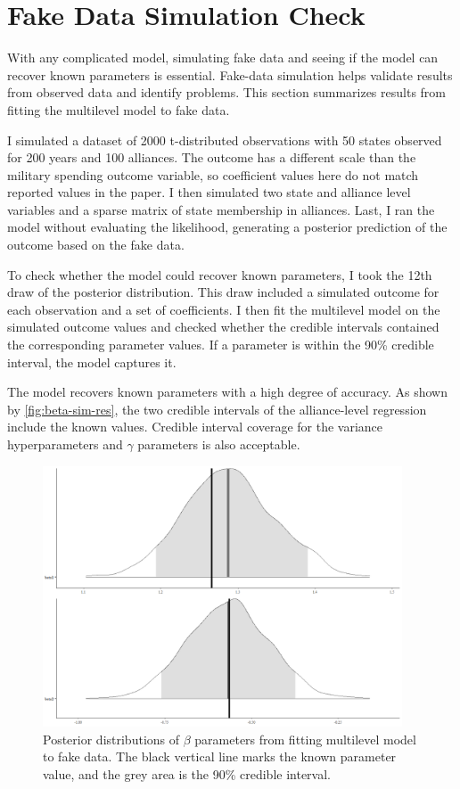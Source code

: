 \documentclass[12pt]{article}
\begin{document}
\section{Fake Data Simulation Check}


With any complicated model, simulating fake data and seeing if the model can recover known parameters is essential. 
Fake-data simulation helps validate results from observed data and identify problems. 
This section summarizes results from fitting the multilevel model to fake data.


I simulated a dataset of 2000 t-distributed observations with 50 states observed for 200 years and 100 alliances. 
The outcome has a different scale than the military spending outcome variable, so coefficient values here do not match reported values in the paper.  
I then simulated two state and alliance level variables and a sparse matrix of state membership in alliances. 
Last, I ran the model without evaluating the likelihood, generating a posterior prediction of the outcome based on the fake data.


To check whether the model could recover known parameters, I took the 12th draw of the posterior distribution.
This draw included a simulated outcome for each observation and a set of coefficients. 
I then fit the multilevel model on the simulated outcome values and checked whether the credible intervals contained the corresponding parameter values. 
If a parameter is within the 90\% credible interval, the model captures it. 


The model recovers known parameters with a high degree of accuracy. 
As shown by \autoref{fig:beta-sim-res}, the two credible intervals of the alliance-level regression include the known values.
Credible interval coverage for the variance hyperparameters and $\gamma$ parameters is also acceptable. 


\begin{figure}[htbp]
	\centering
		\includegraphics[width=0.95\textwidth]{beta-sim-res.png}
	\caption{Posterior distributions of $\beta$ parameters from fitting multilevel model to fake data. The black vertical line marks the known parameter value, and the grey area is the 90\% credible interval.}
	\label{fig:beta-sim-res}
\end{figure}
\end{document}
